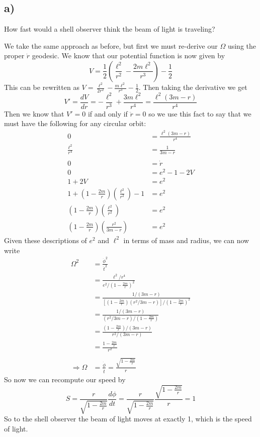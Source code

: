 \documentclass{article}
\theoremstyle{definition}
\begin{document}
    \subsection*{a)}
        \begin{mdframed}
            How fast would a shell observer think the beam of light is traveling?
        \end{mdframed}
        We take the same approach as before, but first we must re-derive our $\Omega$ using the 
        proper $\dot r$ geodesic. We know that our potential function is now given by
        \[
            V = \frac{1}{2}\left(\frac{\ell^2}{r^2} - \frac{2m\ell^2}{r^3}\right) - \frac{1}{2}
        \]
        This can be rewritten as $V = \frac{\ell^2}{2r^2} - \frac{m\ell^2}{r^3} - \frac{1}{2}$. Then taking the derivative we get
        \[
            V' = \frac{dV}{dr} = -\frac{\ell^2}{r^3} + \frac{3m\ell^2}{r^4} = \frac{\ell^2(3m-r)}{r^4}
        \]
        Then we know that $V' = 0$ if and only if $\ddot r = 0$ so we use this fact to say that we must have the following
        for any circular orbit:
        \begin{align*}
            0 & = \frac{\ell^2(3m -r)}{r^4} \\
            \frac{\ell^2}{r^4} &= \frac{1}{3m -r} \\\\
            0 & = \dot r \\
            0 &= e^2 - 1 - 2V \\
            1 + 2V & = e^2 \\
            1 + \left(1-\frac{2m}{r}\right)\left(\frac{\ell^2}{r^2}\right) - 1 &= e^2 \\
            \left(1-\frac{2m}{r}\right)\left(\frac{\ell^2}{r^2}\right) &= e^2 \\
            \left(1-\frac{2m}{r}\right)\left(\frac{r^2}{3m-r}\right) &= e^2 
        \end{align*}
        Given these descriptions of $e^2$ and $\ell^2$ in terms of mass and radius, we can now write 
        \begin{align*}
            \Omega^2 &= \frac{\dot \phi^2}{\dot t^2}\\
            &= \frac{\ell^2 / r^4}{e^2 / \left(1- \frac{2m}{r}\right)^2} \\
            &= \frac{1 / (3m - r)}{\left[(1 - \frac{2m}{r})\left(r^2 / 3m - r\right)\right]/(1 - \frac{2m}{r})^2} \\
            &= \frac{1 / (3m-r)}{\left(r^2 / 3m - r\right)/(1 - \frac{2m}{r})} \\
            &= \frac{(1-\frac{2m}{r})/(3m-r)}{r^2/(3m-r)}\\
            &= \frac{1 - \frac{2m}{r}}{r^2}\\\\
            \Longrightarrow \Omega &= \frac{\dot \phi}{\dot t} = \frac{\sqrt{1-\frac{2m}{r}}}{r}
        \end{align*}
        So now we can recompute our speed by 
        \[
            S = \frac{r}{\sqrt{1-\frac{2m}{r}}} \frac{d\phi}{dt} = \frac{r}{\sqrt{1-\frac{2m}{r}}}\frac{\sqrt{1-\frac{2m}{r}}}{r} = 1
        \]
        So to the shell observer the beam of light moves at exactly 1, which is the speed of light.
\end{document}
